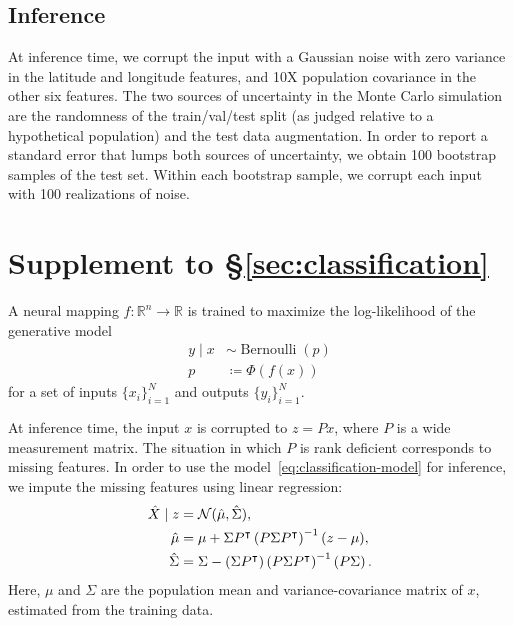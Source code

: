 \documentclass{article}
\begin{document}
\subsection{Inference}
At inference time, we corrupt the input with a Gaussian noise with zero variance in the latitude and longitude features, and 10X population covariance in the other six features.
The two sources of uncertainty in the Monte Carlo simulation are the randomness of the train/val/test split (as judged relative to a hypothetical population) and the test data augmentation.
In order to report a standard error that lumps both sources of uncertainty, we obtain 100 bootstrap samples of the test set.
Within each bootstrap sample, we corrupt each input with 100 realizations of noise.

\clearpage
\section{Supplement to \S\ref{sec:classification}}
\label{app:classification}
A neural mapping \(f: \mathbb R ^{n} \to \mathbb R\) is trained to maximize the log-likelihood of the generative model
\begin{align}
\label{eq:classification-model}
  y \mid x &\sim \operatorname{Bernoulli}(p)
  \\
  p &\coloneqq \Phi(f(x))
\end{align}
for a set of inputs \(\{x_i\}_{i=1}^N\) and outputs \(\{y_i\}_{i=1}^N\).

At inference time, the input \(x\) is corrupted to \(z = Px\), where \(P\) is a wide measurement matrix.
The situation in which \(P\) is rank deficient corresponds to missing features.
In order to use the model~\eqref{eq:classification-model} for inference, we impute the missing features using linear regression:
\begin{subequations}
\label{eq:classification-imputation}
\begin{align}
  \hat X \mid z
  &= \mathcal N(\hat \mu, \hat \Sigma),\\
  \hat \mu
  &= \mu + \Sigma P^\intercal \del{P \Sigma P^\intercal}^{-1} (z - \mu),\\
  \hat \Sigma
  &= \Sigma - \del{\Sigma P^\intercal} \del{P \Sigma P^\intercal}^{-1} \del{P \Sigma}.
\end{align}
\end{subequations}
Here, \(\mu\) and \(\Sigma\) are the population mean and variance-covariance matrix of \(x\), estimated from the training data.
\end{document}
